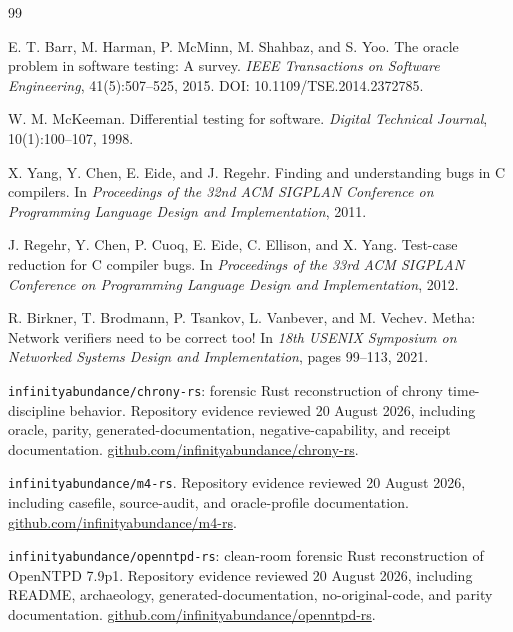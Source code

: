 \documentclass[11pt,a4paper]{article}
\begin{document}
\clearpage
\begingroup
\raggedright
\begin{thebibliography}{99}

E. T. Barr, M. Harman, P. McMinn, M. Shahbaz, and S. Yoo.
\newblock The oracle problem in software testing: A survey.
\newblock \emph{IEEE Transactions on Software Engineering}, 41(5):507--525, 2015.
\newblock DOI: 10.1109/TSE.2014.2372785.

W. M. McKeeman.
\newblock Differential testing for software.
\newblock \emph{Digital Technical Journal}, 10(1):100--107, 1998.

X. Yang, Y. Chen, E. Eide, and J. Regehr.
\newblock Finding and understanding bugs in C compilers.
\newblock In \emph{Proceedings of the 32nd ACM SIGPLAN Conference on Programming Language Design and Implementation}, 2011.

J. Regehr, Y. Chen, P. Cuoq, E. Eide, C. Ellison, and X. Yang.
\newblock Test-case reduction for C compiler bugs.
\newblock In \emph{Proceedings of the 33rd ACM SIGPLAN Conference on Programming Language Design and Implementation}, 2012.

R. Birkner, T. Brodmann, P. Tsankov, L. Vanbever, and M. Vechev.
\newblock Metha: Network verifiers need to be correct too!
\newblock In \emph{18th USENIX Symposium on Networked Systems Design and Implementation}, pages 99--113, 2021.

\texttt{infinityabundance/chrony-rs}: forensic Rust reconstruction of chrony time-discipline behavior.
\newblock Repository evidence reviewed 20 August 2026, including oracle, parity, generated-documentation, negative-capability, and receipt documentation.
\newblock \href{https://github.com/infinityabundance/chrony-rs}{github.com/infinityabundance/chrony-rs}.

\texttt{infinityabundance/m4-rs}.
\newblock Repository evidence reviewed 20 August 2026, including casefile, source-audit, and oracle-profile documentation.
\newblock \href{https://github.com/infinityabundance/m4-rs}{github.com/infinityabundance/m4-rs}.

\texttt{infinityabundance/openntpd-rs}: clean-room forensic Rust reconstruction of OpenNTPD 7.9p1.
\newblock Repository evidence reviewed 20 August 2026, including README, archaeology, generated-documentation, no-original-code, and parity documentation.
\newblock \href{https://github.com/infinityabundance/openntpd-rs}{github.com/infinityabundance/openntpd-rs}.


\end{thebibliography}
\end{document}
